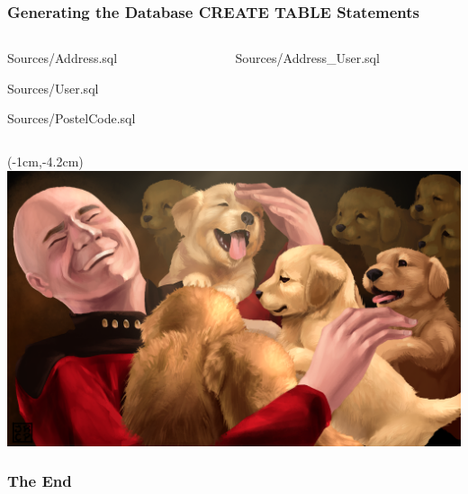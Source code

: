 \documentclass[xelatex,13pt]{beamer}
\begin{document}
\begin{frame}
	\frametitle{Generating the Database CREATE TABLE Statements}
	\begin{columns}[T]
		\begin{column}{0.49\linewidth}
	
		{Sources/Address.sql}
	
			{Sources/User.sql}
	
			{Sources/PostelCode.sql}
		\end{column}
		\begin{column}{0.49\linewidth}
	
			{Sources/Address_User.sql}
		\end{column}
		
	\end{columns}
\end{frame}

\begin{frame}[plain]
\begin{textblock*}{0cm}(-1cm,-4.2cm)
	\includegraphics[width=1.0\paperwidth]{picardpuppy.png}
\end{textblock*}
\end{frame}

\begin{frame}
	\frametitle{The End}
	
\end{frame}
\end{document}
